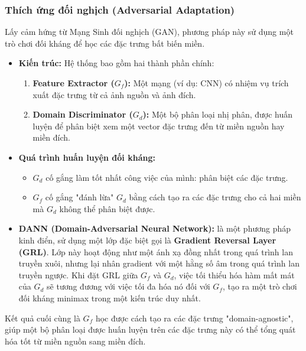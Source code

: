 \subsubsection{Thích ứng đối nghịch (Adversarial Adaptation)}
\label{subsubsec:adversarial_adaptation}
Lấy cảm hứng từ Mạng Sinh đối nghịch (GAN), phương pháp này sử dụng một trò chơi đối kháng để học các đặc trưng bất biến miền.
\begin{itemize}
	\item \textbf{Kiến trúc:} Hệ thống bao gồm hai thành phần chính:
	\begin{enumerate}
		\item \textbf{Feature Extractor ($G_f$):} Một mạng (ví dụ: CNN) có nhiệm vụ trích xuất đặc trưng từ cả ảnh nguồn và ảnh đích.
		\item \textbf{Domain Discriminator ($G_d$):} Một bộ phân loại nhị phân, được huấn luyện để phân biệt xem một vector đặc trưng đến từ miền nguồn hay miền đích.
	\end{enumerate}
	\item \textbf{Quá trình huấn luyện đối kháng:}
	\begin{itemize}
		\item $G_d$ cố gắng làm tốt nhất công việc của mình: phân biệt các đặc trưng.
		\item $G_f$ cố gắng "đánh lừa" $G_d$ bằng cách tạo ra các đặc trưng cho cả hai miền mà $G_d$ không thể phân biệt được.
	\end{itemize}
	\item \textbf{DANN (Domain-Adversarial Neural Network):} \cite{Ganin2016} là một phương pháp kinh điển, sử dụng một lớp đặc biệt gọi là \textbf{Gradient Reversal Layer (GRL)}. Lớp này hoạt động như một ánh xạ đồng nhất trong quá trình lan truyền xuôi, nhưng lại nhân gradient với một hằng số âm trong quá trình lan truyền ngược. Khi đặt GRL giữa $G_f$ và $G_d$, việc tối thiểu hóa hàm mất mát của $G_d$ sẽ tương đương với việc tối đa hóa nó đối với $G_f$, tạo ra một trò chơi đối kháng minimax trong một kiến trúc duy nhất.
\end{itemize}
Kết quả cuối cùng là $G_f$ học được cách tạo ra các đặc trưng "domain-agnostic", giúp một bộ phân loại được huấn luyện trên các đặc trưng này có thể tổng quát hóa tốt từ miền nguồn sang miền đích.


